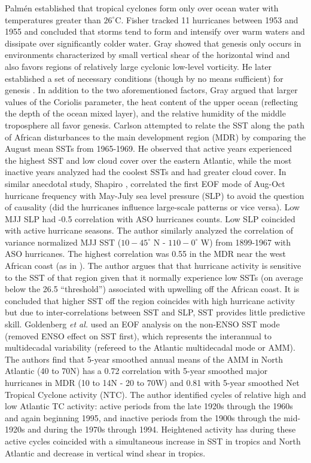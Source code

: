 \documentclass[a4paper,10pt]{article}
\begin{document}
Palmén \cite{palmen1948} established that tropical cyclones form only over ocean water with temperatures greater than $26^{\circ}$C. Fisher \cite{fisher1958} tracked 11 hurricanes between 1953 and 1955 and concluded that storms tend to form and intensify over warm waters and dissipate over significantly colder water. Gray \cite{gray1968} showed that genesis only occurs in environments characterized by small vertical shear of the horizontal wind and also favors regions of relatively large cyclonic low-level vorticity. He later established a set of necessary conditions (though by no means sufficient) for genesis \cite{gray1979}. In addition to the two aforementioned factors, Gray argued that larger values of the Coriolis parameter, the heat content of the upper ocean (reflecting the depth of the ocean mixed layer), and the relative humidity of the middle troposphere all favor genesis.
Carlson \cite{carlson1971} attempted to relate the SST along the path of African disturbances to the main development region (MDR) by comparing the August mean SSTs from 1965-1969. He observed that active years experienced the highest SST and low cloud cover over the eastern Atlantic, while the most inactive years analyzed had the coolest SSTs and had greater cloud cover. In similar anecdotal study, 
Shapiro \cite{shapiro1982}, correlated the first EOF mode of Aug-Oct hurricane frequency with May-July sea level pressure (SLP) to avoid the question of causality (did the hurricanes influence large-scale patterns or vice versa). Low MJJ SLP had -0.5 correlation with ASO hurricanes counts. Low SLP coincided with active hurricane seasons. The author similarly analyzed the correlation of variance normalized MJJ SST ($10-45^\circ$ N - $110-0^\circ$ W) from 1899-1967 with ASO hurricanes. The highest correlation was 0.55 in the MDR near the west African coast (as in \cite{carlson1971}). The author argues that that hurricane activity is sensitive to the SST of that region given that it normally experience low SSTs (on average below the 26.5 ``threshold'') associated with upwelling off the African coast. It is concluded that higher SST off the region coincides with high hurricane activity but due to inter-correlations between SST and SLP, SST provides little predictive skill.
Goldenberg \textit{et al.} \cite{goldenberg2001} used an EOF analysis on the non-ENSO SST mode (removed ENSO effect on SST first), which represents the interannual to multidecadal variability (refereed to the Atlantic multidecadal mode or AMM). The authors find that 5-year smoothed annual means of the AMM in North Atlantic (40 to 70N) has a 0.72 correlation with 5-year smoothed major hurricanes in MDR (10 to 14N - 20 to 70W) and 0.81 with 5-year smoothed Net Tropical Cyclone activity (NTC). The author identified cycles of relative high and low Atlantic TC activity: active periods from the late 1920s through the 1960s and again beginning 1995, and inactive periods from the 1900s through the mid-1920s and during the 1970s through 1994. Heightened activity has during these active cycles coincided with a simultaneous increase in SST in tropics and North Atlantic and decrease in vertical wind shear in tropics. 
\end{document}
